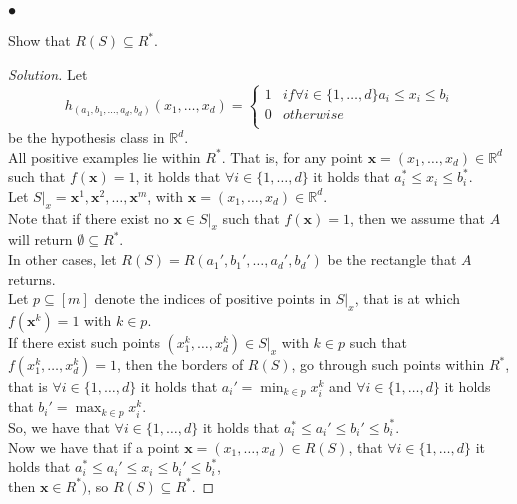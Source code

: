 \documentclass[10pt, a4paper, twoside]{amsart}
\newcommand{\R}{\ensuremath{\mathbb{R}}}
\newenvironment{solution}
               {\let\oldqedsymbol=\qedsymbol
                \renewcommand{\qedsymbol}{$\blacktriangleleft$}
                \begin{proof}[Solution]}
               {\end{proof}
                \renewcommand{\qedsymbol}{\oldqedsymbol}}
\begin{document}
\subsubsection*{$\bullet$}
Show that $R(S)\subseteq R^*$.
\begin{solution}
Let
\begin{equation*}
  h_{(a_1,b_1,\ldots,a_d,b_d)}(x_1,\ldots,x_d) = 
 \begin{cases}
  1 & if \forall i \in \{1,\ldots,d \} a_i \leq x_i \leq b_i \\
  0 & otherwise\\
\end{cases}
\end{equation*}
be the hypothesis class in $\R^d$.\\
All positive examples lie within $R^*$. That is, for any point $\mathbf{x} = (x_1,\ldots,x_d) \in \R^d$ such that $f(\mathbf{x})=1$, it holds that $\forall i \in \{1,\ldots,d\}$ it holds that $ a_i^*\leq x_i \leq b_i^*$.\\
Let $S|_x = {\mathbf{x}^1, \mathbf{x}^2,\ldots, \mathbf{x}^m}$, with $\mathbf{x} = (x_1,\ldots,x_d) \in \R^d$.\\
Note that if there exist no $\mathbf{x} \in S|_x$ such that $f(\mathbf{x})=1$, then we assume that $A$ will return $\emptyset \subseteq R^*$.\\
In other cases, let $R(S)=R(a_1',b_1',\ldots,a_d',b_d')$ be the rectangle that $A$ returns.\\
Let $p \subseteq [m]$ denote the indices of positive points in $S|_x$, that is at which $f(\mathbf{x}^k)=1$ with $k \in p$.\\
If there exist such points $(x^k_1,\ldots,x^k_d)\in S|_x$  with $k \in p$ such that $f(x^k_1,\ldots,x^k_d)=1$, then the borders of $R(S)$, go through such points within $R^*$,\\
that is $\forall i \in \{1,\ldots,d\}$ it holds that $ a_i' = \min_{k\in p} x^k_i$ and $\forall i \in \{1,\ldots,d\}$ it holds that $b_i' = \max_{k\in p} x^k_i$.\\
So, we have that $\forall i \in \{1,\ldots,d\}$ it holds that $a_i^*\leq a_i'\leq b_i' \leq b_i^*$.\\
Now we have that if a point $\mathbf{x} = (x_1,\ldots ,x_d)\in R(S)$, that $\forall i \in \{1,\ldots,d\}$ it holds that $a_i^*\leq a_i'\leq x_i \leq b_i' \leq b_i^*$,\\
then $\mathbf{x} \in R^*)$, so $R(S) \subseteq R^*$.
\end{solution}
\end{document}
